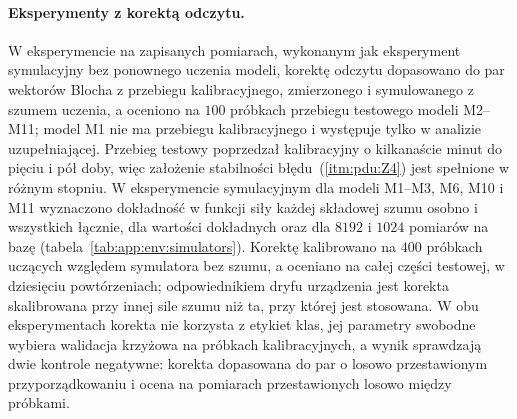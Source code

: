 \paragraph{Eksperymenty z korektą odczytu.}
W eksperymencie na zapisanych pomiarach, wykonanym jak eksperyment symulacyjny bez ponownego uczenia modeli, korektę odczytu dopasowano do par wektorów Blocha z przebiegu kalibracyjnego, zmierzonego i symulowanego z szumem uczenia, a oceniono na $100$ próbkach przebiegu testowego modeli M2--M11; model M1 nie ma przebiegu kalibracyjnego i występuje tylko w analizie uzupełniającej.
Przebieg testowy poprzedzał kalibracyjny o kilkanaście minut do pięciu i pół doby, więc założenie stabilności błędu~(\ref{itm:pdu:Z4}) jest spełnione w różnym stopniu.
W eksperymencie symulacyjnym dla modeli M1--M3, M6, M10 i M11 wyznaczono dokładność w funkcji siły każdej składowej szumu osobno i wszystkich łącznie, dla wartości dokładnych oraz dla $8192$ i $1024$ pomiarów na bazę (tabela~\ref{tab:app:env:simulators}).
Korektę kalibrowano na $400$ próbkach uczących względem symulatora bez szumu, a oceniano na całej części testowej, w dziesięciu powtórzeniach; odpowiednikiem dryfu urządzenia jest korekta skalibrowana przy innej sile szumu niż ta, przy której jest stosowana.
W obu eksperymentach korekta nie korzysta z etykiet klas, jej parametry swobodne wybiera walidacja krzyżowa na próbkach kalibracyjnych, a wynik sprawdzają dwie kontrole negatywne: korekta dopasowana do par o losowo przestawionym przyporządkowaniu i ocena na pomiarach przestawionych losowo między próbkami.

